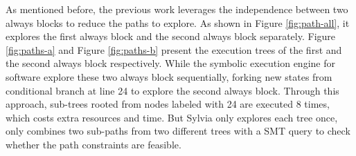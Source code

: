 \documentclass[conference]{IEEEtran}
\begin{document}
As mentioned before, the previous work leverages the independence between two always blocks to reduce the paths to explore. As shown in Figure \ref{fig:path-all}, it explores the first always block and the second always block separately. Figure \ref{fig:paths-a} and Figure \ref{fig:paths-b} present the execution trees of the first and the second always block respectively. While the symbolic execution engine for software explore these two always block sequentially, forking new states from conditional branch at line 24 to explore the second always block. Through this approach, sub-trees rooted from nodes labeled with 24 are executed 8 times, which costs extra resources and time. But Sylvia only explores each tree once, only combines two sub-paths from two different trees with a SMT query to check whether the path constraints are feasible.
\end{document}
